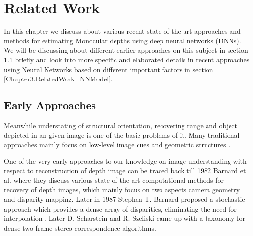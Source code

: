 
\chapter{Related Work} %

\label{Chapter3:RelatedWork} %

In this chapter we discuss about various recent state of the art approaches and methods for estimating Monocular depths using deep neural networks (DNNs). We will be discussing about different earlier approaches on this subject in section \ref{Chapter3:RelatedWork_EarlyApproach} briefly and look into more specific and elaborated details in recent approaches using Neural Networks based on different important factors in section \ref{Chapter3:RelatedWork_NNModel}. 

\section{Early Approaches}
\label{Chapter3:RelatedWork_EarlyApproach}
Meanwhile understating of structural orientation, recovering range and object depicted in an given image is one of the basic problems of it. Many traditional approaches mainly focus on low-level image cues and geometric structures \cite{torralba2002depth, pentland1987new,lai1992generalized,saxena2006learning}.
 
One of the very early approaches to our knowledge on image understanding with respect to reconstruction of depth image can be traced back till 1982 Barnard et al. \cite{barnard1982computational} where they discuss various state of the art  computational methods for recovery of depth images, which mainly focus on two aspects camera geometry and disparity mapping. Later in 1987 Stephen T. Barnard proposed a stochastic approach which provides a dense array of disparities, eliminating the need for interpolation \cite{barnard1987stochastic}. Later D. Scharstein and R. Szeliski \cite{scharstein2002taxonomy} came up with a taxonomy for dense two-frame stereo correspondence algorithms. \\

